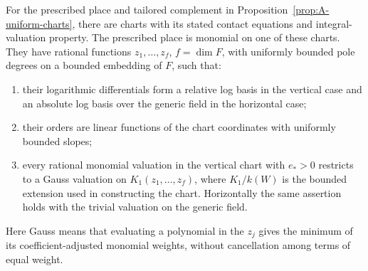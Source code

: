 \begin{lemma}\label{lem:A-toroidal-charts}
For the prescribed place and tailored complement in
Proposition~\ref{prop:A-uniform-charts}, there are charts with its stated
contact equations and integral-valuation property.  The prescribed
place is monomial on one of these charts.  They have rational functions
\(z_1,\ldots,z_f\), \(f=\dim F\), with uniformly bounded pole degrees on
a bounded embedding of \(F\), such that:
\begin{enumerate}[label=\textup{(\roman*)}]
\item their logarithmic differentials form a relative log basis in the
vertical case and an absolute log basis over the generic field in the
horizontal case;
\item their orders are linear functions of the chart coordinates with
uniformly bounded slopes;
\item every rational monomial valuation in the vertical chart with
\(e_*>0\) restricts to a Gauss valuation on
\(K_1(z_1,\ldots,z_f)\), where \(K_1/k(W)\) is the bounded extension
used in constructing the chart.  Horizontally the same assertion holds
with the trivial valuation on the generic field.
\end{enumerate}
Here Gauss means that evaluating a polynomial in the \(z_j\) gives the
minimum of its coefficient-adjusted monomial weights, without
cancellation among terms of equal weight.
\end{lemma}

